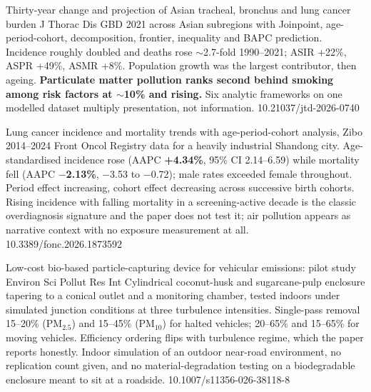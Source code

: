 \documentclass[10pt]{article}
\begin{document}
{Thirty-year change and projection of Asian tracheal, bronchus and lung cancer burden}
{J Thorac Dis}
{GBD 2021 across Asian subregions with Joinpoint, age-period-cohort, decomposition,
frontier, inequality and BAPC prediction. Incidence roughly doubled and deaths rose
$\sim$2.7-fold 1990--2021; ASIR +22\%, ASPR +49\%, ASMR +8\%. Population growth was the
largest contributor, then ageing. \textbf{Particulate matter pollution ranks second
behind smoking among risk factors at $\sim$10\% and rising.} Six analytic frameworks on
one modelled dataset multiply presentation, not information.}
{10.21037/jtd-2026-0740}

{Lung cancer incidence and mortality trends with age-period-cohort analysis, Zibo 2014--2024}
{Front Oncol}
{Registry data for a heavily industrial Shandong city. Age-standardised incidence rose
(AAPC \textbf{+4.34\%}, 95\% CI 2.14--6.59) while mortality fell (AAPC \textbf{$-$2.13\%},
$-$3.53 to $-$0.72); male rates exceeded female throughout. Period effect increasing,
cohort effect decreasing across successive birth cohorts. Rising incidence with falling
mortality in a screening-active decade is the classic overdiagnosis signature and the
paper does not test it; air pollution appears as narrative context with no exposure
measurement at all.}
{10.3389/fonc.2026.1873592}

{Low-cost bio-based particle-capturing device for vehicular emissions: pilot study}
{Environ Sci Pollut Res Int}
{Cylindrical coconut-husk and sugarcane-pulp enclosure tapering to a conical outlet and
a monitoring chamber, tested indoors under simulated junction conditions at three
turbulence intensities. Single-pass removal 15--20\% (PM$_{2.5}$) and 15--45\%
(PM$_{10}$) for halted vehicles; 20--65\% and 15--65\% for moving vehicles. Efficiency
ordering flips with turbulence regime, which the paper reports honestly. Indoor
simulation of an outdoor near-road environment, no replication count given, and no
material-degradation testing on a biodegradable enclosure meant to sit at a roadside.}
{10.1007/s11356-026-38118-8}

\clearpage

\end{document}
